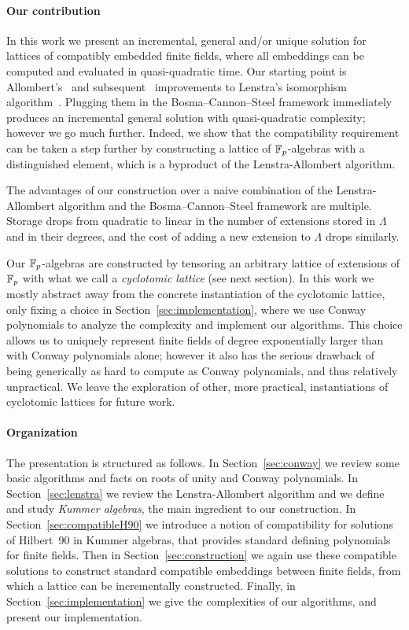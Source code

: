 \documentclass[sigconf]{acmart}
\begin{document}
\paragraph{Our contribution}
In this work we present an incremental, general and/or unique solution
for lattices of compatibly embedded finite fields, where all
embeddings can be computed and evaluated in quasi-quadratic time. %
Our starting point is Allombert's~\cite{Allombert02} and
subsequent~\cite{brieulle2018computing} improvements to Lenstra's
isomorphism algorithm~\cite{LenstraJr91}. %
Plugging them in the Bosma--Cannon--Steel framework immediately produces
an incremental general solution with quasi-quadratic complexity;
however we go much further. %
Indeed, we show that the compatibility requirement can be taken a step
further by constructing a lattice of $\mathbb{F}_{p}$-algebras with a
distinguished element, which is a byproduct of the Lenstra-Allombert
algorithm.

The advantages of our construction over a naive combination of the
Lenstra-Allombert algorithm and the Bosma--Cannon--Steel framework are
multiple. %
Storage drops from quadratic to linear in the number of extensions
stored in $\Lambda$ and in their degrees, and the cost of adding a new
extension to $\Lambda$ drops similarly. %

Our $\mathbb{F}_{p}$-algebras are constructed by tensoring an arbitrary
lattice of extensions of $\mathbb{F}_{p}$ with what we call a \emph{cyclotomic
  lattice} (see next section). %
In this work we mostly abstract away from the concrete instantiation
of the cyclotomic lattice, only fixing a choice in
Section~\ref{sec:implementation}, where we use Conway polynomials to
analyze the complexity and implement our algorithms. %
This choice allows us to uniquely represent finite fields of degree
exponentially larger than with Conway polynomials alone; however it
also has the serious drawback of being generically as hard to compute
as Conway polynomials, and thus relatively unpractical. %
We leave the exploration of other, more practical, instantiations of
cyclotomic lattices for future work.


\paragraph{Organization}
The presentation is structured as follows. %
In Section~\ref{sec:conway} we review some basic algorithms and facts
on roots of unity and Conway polynomials. %
In Section~\ref{sec:lenstra} we review the Lenstra-Allombert algorithm
and we define and study \emph{Kummer algebras}, the main ingredient to
our construction. %
In Section~\ref{sec:compatibleH90} we introduce a notion of
compatibility for solutions of Hilbert~90 in Kummer algebras, that
provides standard defining polynomials for finite fields.  Then in
Section~\ref{sec:construction} we again use these compatible solutions
to construct standard compatible embeddings between finite fields,
from which a lattice can be incrementally constructed.  Finally, in
Section~\ref{sec:implementation} we give the complexities of our
algorithms, and present our implementation.
\end{document}
